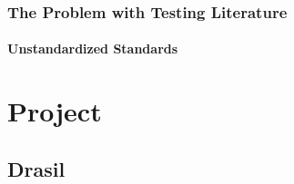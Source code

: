 \documentclass{beamer}
\begin{document}

\begin{frame}
    \frametitle{The Problem with Testing Literature}
    \framesubtitle{Unstandardized Standards}
\end{frame}

\section{Project}
\subsection{Drasil}


\end{document}
